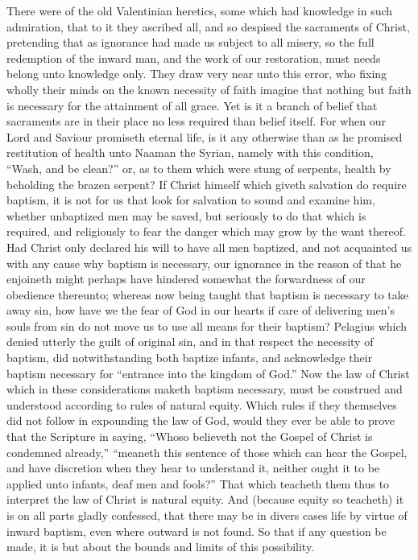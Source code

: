 There were of the old Valentinian heretics, some which had knowledge in such admiration, that to it they ascribed all, and so despised the sacraments of Christ, pretending that as ignorance had made us subject to all misery, so the full redemption of the inward man, and the work of our restoration, must needs belong unto knowledge only. They draw very near unto this error, who fixing wholly their minds on the known necessity of faith imagine that nothing but faith is necessary for the attainment of all grace. Yet is it a branch of belief that sacraments are in their place no less required than belief itself. For when our Lord and Saviour promiseth eternal life, is it any otherwise than as he promised restitution of health unto Naaman the Syrian, namely with  this condition, “Wash, and be clean?” or, as to them which were stung of serpents, health by beholding the brazen serpent? If Christ himself which giveth salvation do require baptism, it is not for us that look for salvation to sound and examine him, whether unbaptized men may be saved, but seriously to do that which is required, and religiously to fear the danger which may grow by the want thereof. Had Christ only declared his will to have all men baptized, and not acquainted us with any cause why baptism is necessary, our ignorance in the reason of that he enjoineth might perhaps have hindered somewhat the forwardness of our obedience thereunto; whereas now being taught that baptism is necessary to take away sin, how have we the fear of God in our hearts if care of delivering men’s souls from sin do not move us to use all means for their baptism? Pelagius which denied utterly the guilt of original sin, and in that respect the necessity of baptism, did notwithstanding both baptize infants, and acknowledge their baptism necessary for “entrance into the kingdom of God.”
Now the law of Christ which in these considerations maketh baptism necessary, must be construed and understood according to rules of natural equity. Which rules if they themselves did not follow in expounding the law of God, would they ever be able to prove that the Scripture in saying, “Whoso believeth not the Gospel of Christ is condemned already,” “meaneth this sentence of those which can hear the Gospel, and have discretion when they hear to understand it, neither ought it to be applied unto infants, deaf men and fools?” That which teacheth them  thus to interpret the law of Christ is natural equity. And (because equity so teacheth) it is on all parts gladly confessed, that there may be in divers cases life by virtue of inward baptism, even where outward is not found. So that if any question be made, it is but about the bounds and limits of this possibility.
